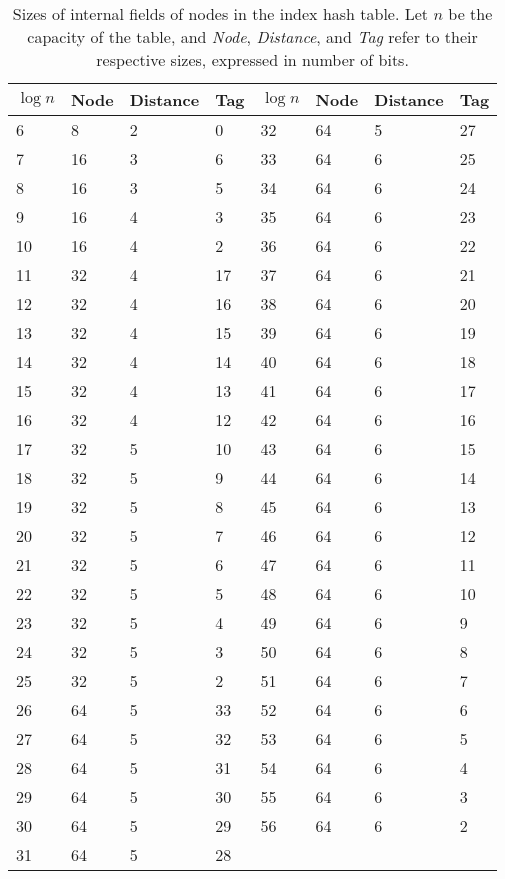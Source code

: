 \begin{table}
	\centering\begin{tabular}{llll|llll}
		$\log n$ & Node & Distance & Tag & $\log n$ & Node & Distance & Tag\\
		\hline
		6 & 8 & 2 & 0 & 32 & 64 & 5 & 27 \\
		7 & 16 & 3 & 6 & 33 & 64 & 6 & 25 \\
		8 & 16 & 3 & 5 & 34 & 64 & 6 & 24 \\
		9 & 16 & 4 & 3 & 35 & 64 & 6 & 23 \\
		10 & 16 & 4 & 2 & 36 & 64 & 6 & 22 \\
		11 & 32 & 4 & 17 & 37 & 64 & 6 & 21 \\
		12 & 32 & 4 & 16 & 38 & 64 & 6 & 20 \\
		13 & 32 & 4 & 15 & 39 & 64 & 6 & 19 \\
		14 & 32 & 4 & 14 & 40 & 64 & 6 & 18 \\
		15 & 32 & 4 & 13 & 41 & 64 & 6 & 17 \\
		16 & 32 & 4 & 12 & 42 & 64 & 6 & 16 \\
		17 & 32 & 5 & 10 & 43 & 64 & 6 & 15 \\
		18 & 32 & 5 & 9 & 44 & 64 & 6 & 14 \\
		19 & 32 & 5 & 8 & 45 & 64 & 6 & 13 \\
		20 & 32 & 5 & 7 & 46 & 64 & 6 & 12 \\
		21 & 32 & 5 & 6 & 47 & 64 & 6 & 11 \\
		22 & 32 & 5 & 5 & 48 & 64 & 6 & 10 \\
		23 & 32 & 5 & 4 & 49 & 64 & 6 & 9 \\
		24 & 32 & 5 & 3 & 50 & 64 & 6 & 8 \\
		25 & 32 & 5 & 2 & 51 & 64 & 6 & 7 \\
		26 & 64 & 5 & 33 & 52 & 64 & 6 & 6 \\
		27 & 64 & 5 & 32 & 53 & 64 & 6 & 5 \\
		28 & 64 & 5 & 31 & 54 & 64 & 6 & 4 \\
		29 & 64 & 5 & 30 & 55 & 64 & 6 & 3 \\
		30 & 64 & 5 & 29 & 56 & 64 & 6 & 2 \\
		31 & 64 & 5 & 28 & \\
	\end{tabular}
	\caption{Sizes of internal fields of nodes in the index hash table. Let $n$ be the capacity of the table, and \emph{Node}, \emph{Distance}, and \emph{Tag} refer to their respective sizes, expressed in number of bits.}
	\label{tab:robin-hood-nodes}
\end{table}

